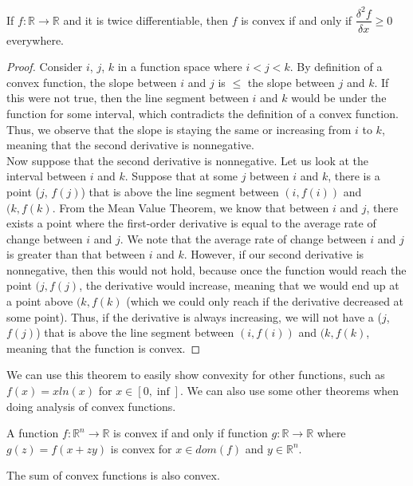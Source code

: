 \documentclass[11pt]{article}
\begin{document}
\begin{theorem}
If $f: \mathbb{R} \longrightarrow \mathbb{R}$ and it is twice differentiable, then $f$ is convex if and only if $\dfrac{\delta ^{2}f}{\delta x} \geq 0$ everywhere.
\end{theorem}
\begin{proof}
Consider $i$, $j$, $k$ in a function space where $i < j < k$.  By definition of a convex function, the slope between $i$ and $j$ is $\leq$ the slope between $j$ and $k$.  If this were not true, then the line segment between $i$ and $k$ would be under the function for some interval, which contradicts the definition of a convex function.  Thus, we observe that the slope is staying the same or increasing from $i$ to $k$, meaning that the second derivative is nonnegative.\\
Now suppose that the second derivative is nonnegative.  Let us look at the interval between $i$ and $k$.  Suppose that at some $j$ between $i$ and $k$, there is a point ($j$, $f(j)$) that is above the line segment between $(i, f(i))$ and $(k, f(k)$.  From the Mean Value Theorem, we know that between $i$ and $j$, there exists a point where the first-order derivative is equal to the average rate of change between $i$ and $j$.  We note that the average rate of change between $i$ and $j$ is greater than that between $i$ and $k$.  However, if our second derivative is nonnegative, then this would not hold, because once the function would reach the point $(j, f(j)$, the derivative would increase, meaning that we would end up at a point above $(k, f(k)$ (which we could only reach if the derivative decreased at some point).  Thus, if the derivative is always increasing, we will not have a ($j$, $f(j)$) that is above the line segment between $(i, f(i))$ and $(k, f(k)$, meaning that the function is convex.
\end{proof}

We can use this theorem to easily show convexity for other functions, such as $f(x) = xln(x)$ for $x \in [0, \inf]$.  We can also use some other theorems when doing analysis of convex functions.
\begin{theorem}
A function $f: \mathbb{R}^{n} \longrightarrow \mathbb{R}$ is convex if and only if function $g:  \mathbb{R} \longrightarrow \mathbb{R}$ where $g(z) = f(x + zy)$ is convex for $x \in dom(f)$ and $y \in \mathbb{R}^{n}$.
\end{theorem}

\begin{theorem}
The sum of convex functions is also convex.
\end{theorem}
\end{document}
